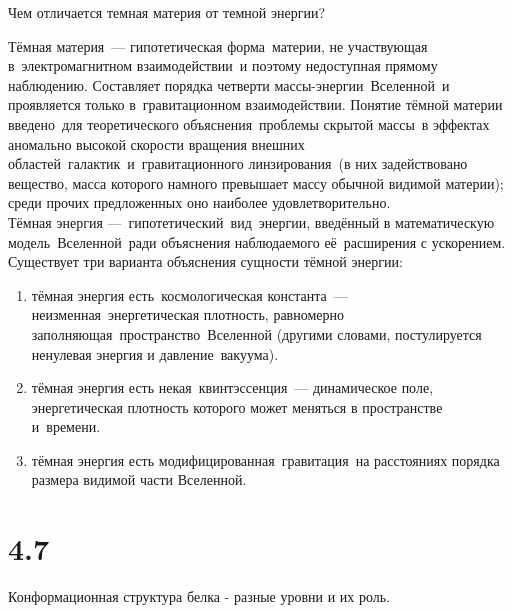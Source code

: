 \documentclass[a4paper,14pt]{article}
\begin{document}
\begin{center}
	Чем отличается темная материя от темной энергии?\\
\end{center}

Тёмная материя — гипотетическая форма материи, не участвующая в электромагнитном взаимодействии и поэтому недоступная прямому наблюдению. Составляет порядка четверти массы-энергии Вселенной и проявляется только в гравитационном взаимодействии. Понятие тёмной материи введено для теоретического объяснения проблемы скрытой массы в эффектах аномально высокой скорости вращения внешних областей галактик и гравитационного линзирования (в них задействовано вещество, масса которого намного превышает массу обычной видимой материи); среди прочих предложенных оно наиболее удовлетворительно.\\

Тёмная энергия — гипотетический вид энергии, введённый в математическую модель Вселенной ради объяснения наблюдаемого её расширения с ускорением.
Существует три варианта объяснения сущности тёмной энергии:
\begin{enumerate}
	\item тёмная энергия есть космологическая константа — неизменная энергетическая плотность, равномерно заполняющая пространство Вселенной (другими словами, постулируется ненулевая энергия и давление вакуума).
	\item тёмная энергия есть некая квинтэссенция — динамическое поле, энергетическая плотность которого может меняться в пространстве и времени.
	\item тёмная энергия есть модифицированная гравитация на расстояниях порядка размера видимой части Вселенной.
\end{enumerate}

\section*{4.7}

\begin{center}
	Конформационная структура белка - разные уровни и их роль.\\
\end{center}
\end{document}
